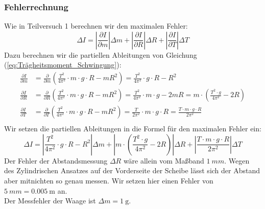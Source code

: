 \documentclass{article}
\begin{document}
			\subsubsection{Fehlerrechnung}
				Wie in Teilversuch 1 berechnen wir den maximalen Fehler:
				\begin{equation}
					\Delta I = 
					\left| \frac{\partial I}{\partial m} \right| \Delta m +
					\left| \frac{\partial I}{\partial R} \right| \Delta R +
					\left| \frac{\partial I}{\partial T} \right| \Delta T
				\end{equation}
				Dazu berechnen wir die partiellen Ableitungen von Gleichung (\ref{eq:Trägheitsmoment_Schwingung}):
				\begin{equation}
					\begin{aligned}
						\frac{\partial I}{\partial m} &= \frac{\partial}{\partial m} \left( \frac{T^2}{4 \pi^2} \cdot m \cdot g \cdot R - m R^2 \right) = \frac{T^2}{4 \pi^2} \cdot g \cdot R - R^2 \\
						\frac{\partial I}{\partial R} &= \frac{\partial}{\partial R} \left( \frac{T^2}{4 \pi^2} \cdot m \cdot g \cdot R - m R^2 \right) = \frac{T^2}{4 \pi^2} \cdot m \cdot g - 2 m R = m \cdot \left( \frac{T^2 \cdot g }{4 \pi^2} - 2R \right) \\
						\frac{\partial I}{\partial T} &= \frac{\partial}{\partial T} \left( \frac{T^2}{4 \pi^2} \cdot m \cdot g \cdot R - m R^2 \right) = \frac{T}{2 \pi^2} \cdot m \cdot g \cdot R  = \frac{T \cdot m \cdot g \cdot R}{2 \pi^2 } \\
					\end{aligned}
				\end{equation}
				Wir setzen die partiellen Ableitungen in die Formel für den maximalen Fehler ein:
				\begin{equation}\label{eq:Maximaler_Fehler_Schwingung}
					\Delta I = 
					\left| \frac{T^2}{4 \pi^2} \cdot g \cdot R - R^2 \right| \Delta m +
					\left| m \cdot \left( \frac{T^2 \cdot g }{4 \pi^2} - 2R \right) \right| \Delta R +
					\left| \frac{T \cdot m \cdot g \cdot R}{2 \pi^2 } \right| \Delta T
				\end{equation}
				Der Fehler der Abstandsmessung \(\Delta R\) wäre allein vom Maßband \(\SI{1}{mm}\).
				Wegen des Zylindrischen Ansatzes auf der Vorderseite der Scheibe lässt sich der Abstand aber mitnichten so genau messen.
				Wir setzen hier einen Fehler von \(\SI{5}{mm} = \SI{0,005}{\metre} \) an. \\
				Der Messfehler der Waage ist \(\Delta m = \SI{1}{\gram}\). \\
\end{document}
